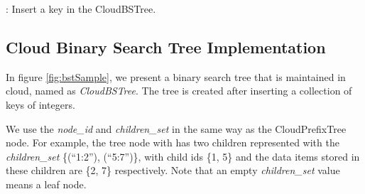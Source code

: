 \documentclass[10pt, conference, compsocconf]{IEEEtran}
\newcommand{\remove}[1]{}
\begin{document}
\remove{
\begin{algorithm}[t]
{\small
  \caption{: Query a key  in the CloudBSTree. If found, return true, otherwise return false.}
\label{algo:bstquery}

\KwIn{The number  to be searched.} 


\smallskip 

\tcc{Start with root node, with id = .}
\;

\smallskip

\While{true}{


\;
\;

\smallskip  

\If(\tcp*[f]{Find the target in tree}){} {}

\;

  \If(\tcp*[f]{curNode is a leaf.}){}{\;}
}
}
\end{algorithm}
}
\begin{algorithm}[t]
{\small
  \caption{: Insert a key  in the CloudBSTree.}
\label{algo:bstinsert}



\smallskip 

\;

\smallskip

\If{}{}

}\end{algorithm}

\subsection{Cloud Binary Search Tree Implementation}
\label{bst}
In figure \ref{fig:bstSample}, we present a binary search tree that is maintained in cloud, named as
\emph{CloudBSTree}. The tree is created after inserting a collection of keys of integers.

We use the \emph{node\_id} and \emph{children\_set} in the same way as the CloudPrefixTree node.
For example, 
the tree node with  has two children represented with the \emph{children\_set} \{(``1:2''), (``5:7'')\}, with child ids \{1, 5\} and the data items stored in these children are
\{2, 7\} respectively. Note that an empty \emph{children\_set} value means a leaf node.
\end{document}
